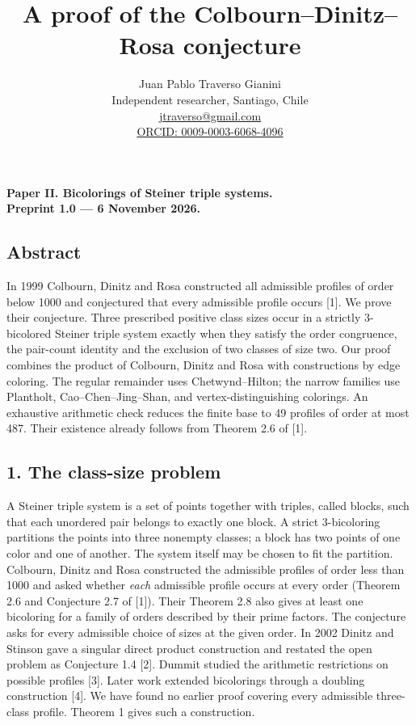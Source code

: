 \documentclass[english,11pt,a4paper]{article}
\title{A proof of the Colbourn–Dinitz–Rosa conjecture}
\author{Juan Pablo Traverso Gianini\\\small Independent researcher, Santiago, Chile\\\small \href{mailto:jtraverso@gmail.com}{jtraverso@gmail.com}\\\small \href{https://orcid.org/0009-0003-6068-4096}{ORCID: 0009-0003-6068-4096}}
\date{}
\newcounter{none}
\begin{document}
\raggedbottom
\maketitle
\textbf{Paper II. Bicolorings of Steiner triple systems.}\\\textbf{Preprint 1.0 — 6 November 2026.}

\subsection{Abstract}\label{abstract}

In 1999 Colbourn, Dinitz and Rosa constructed all admissible profiles of order below 1000 and conjectured that every admissible profile occurs {[}1{]}. We prove their conjecture. Three prescribed positive class sizes occur in a strictly 3-bicolored Steiner triple system exactly when they satisfy the order congruence, the pair-count identity and the exclusion of two classes of size two. Our proof combines the product of Colbourn, Dinitz and Rosa with constructions by edge coloring. The regular remainder uses Chetwynd--Hilton; the narrow families use Plantholt, Cao--Chen--Jing--Shan, and vertex-distinguishing colorings. An exhaustive arithmetic check reduces the finite base to 49 profiles of order at most 487. Their existence already follows from Theorem 2.6 of {[}1{]}.

\subsection{1. The class-size problem}\label{the-class-size-problem}

A Steiner triple system is a set of points together with triples, called blocks, such that each unordered pair belongs to exactly one block. A strict 3-bicoloring partitions the points into three nonempty classes; a block has two points of one color and one of another. The system itself may be chosen to fit the partition. Colbourn, Dinitz and Rosa constructed the admissible profiles of order less than 1000 and asked whether \emph{each} admissible profile occurs at every order (Theorem 2.6 and Conjecture 2.7 of {[}1{]}). Their Theorem 2.8 also gives at least one bicoloring for a family of orders described by their prime factors. The conjecture asks for every admissible choice of sizes at the given order. In 2002 Dinitz and Stinson gave a singular direct product construction and restated the open problem as Conjecture 1.4 {[}2{]}. Dummit studied the arithmetic restrictions on possible profiles {[}3{]}. Later work extended bicolorings through a doubling construction {[}4{]}. We have found no earlier proof covering every admissible three-class profile. Theorem 1 gives such a construction.
\end{document}
